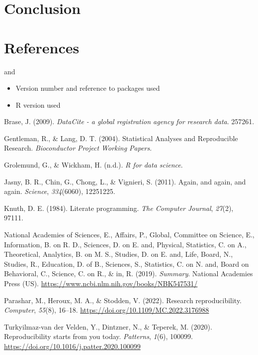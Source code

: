 \documentclass[
  a4paper,
]{article}
\providecommand{\tightlist}{%
  \setlength{\itemsep}{0pt}\setlength{\parskip}{0pt}}\usepackage{longtable,booktabs,array}
\newlength{\cslhangindent}
\newenvironment{CSLReferences}[2] %
 {\begin{list}{}{%
  \setlength{\itemindent}{0pt}
  \setlength{\leftmargin}{0pt}
  \setlength{\parsep}{0pt}
  \ifodd #1
   \setlength{\leftmargin}{\cslhangindent}
   \setlength{\itemindent}{-1\cslhangindent}
  \fi
  \setlength{\itemsep}{#2\baselineskip}}}
 {\end{list}}
\begin{document}
\section{Conclusion}\label{conclusion}

\section{References}\label{references}

and

\begin{itemize}
\tightlist
\item
  Version number and reference to packages used
\item
  R version used
\end{itemize}

\label{refs}
\begin{CSLReferences}{1}{0}
Brase, J. (2009). \emph{DataCite - a global registration agency for
research data}. 257261.

Gentleman, R., \& Lang, D. T. (2004). Statistical {Analyses} and
{Reproducible Research}. \emph{Bioconductor Project Working Papers}.

Grolemund, G., \& Wickham, H. (n.d.). \emph{R for data science}.

Jasny, B. R., Chin, G., Chong, L., \& Vignieri, S. (2011). Again, and
again, and again. \emph{Science}, \emph{334}(6060), 12251225.

Knuth, D. E. (1984). Literate programming. \emph{The Computer Journal},
\emph{27}(2), 97111.

National Academies of Sciences, E., Affairs, P., Global, Committee on
Science, E., Information, B. on R. D., Sciences, D. on E. and, Physical,
Statistics, C. on A., Theoretical, Analytics, B. on M. S., Studies, D.
on E. and, Life, Board, N., Studies, R., Education, D. of B., Sciences,
S., Statistics, C. on N. and, Board on Behavioral, C., Science, C. on
R., \& in, R. (2019). \emph{Summary}. National Academies Press (US).
\url{https://www.ncbi.nlm.nih.gov/books/NBK547531/}

Parashar, M., Heroux, M. A., \& Stodden, V. (2022). Research
reproducibility. \emph{Computer}, \emph{55}(8), 16--18.
\url{https://doi.org/10.1109/MC.2022.3176988}

Turkyilmaz-van der Velden, Y., Dintzner, N., \& Teperek, M. (2020).
Reproducibility starts from you today. \emph{Patterns}, \emph{1}(6),
100099. \url{https://doi.org/10.1016/j.patter.2020.100099}

\end{CSLReferences}
\end{document}
